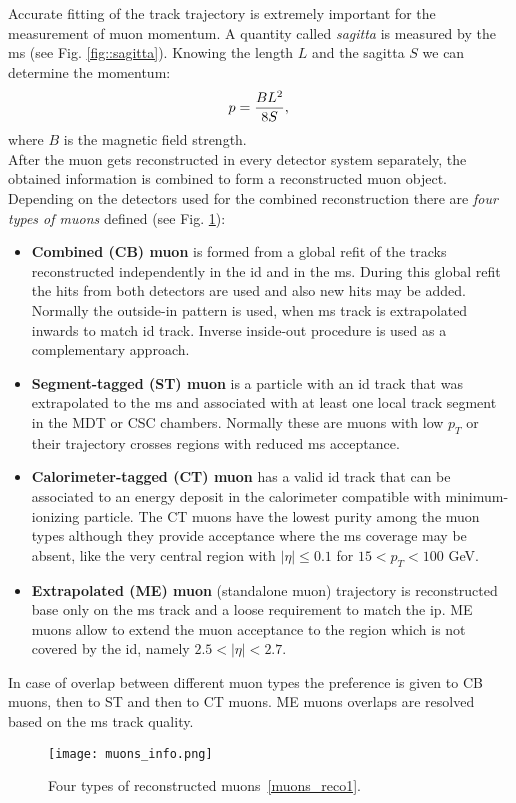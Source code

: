     Accurate fitting of the track trajectory is extremely important for the measurement of muon momentum. A quantity called \textit{sagitta} is measured by the \gls{ms} (see Fig. \ref{fig::sagitta}). Knowing the length $L$ and the sagitta $S$ we can determine the momentum:
    	\begin{equation}
    p = \frac{BL^2}{8S},\\
    \end{equation}
    where $B$ is the magnetic field strength.\\    
    After the muon gets reconstructed in every detector system separately, the obtained information is combined to form a reconstructed muon object. Depending on the detectors used for the combined reconstruction there are \textit{four types of muons} defined (see Fig. \ref{fig::muon_combined}):
    \begin{itemize}
	\item \textbf{Combined (CB) muon} is formed from a global refit of the tracks reconstructed independently in the \gls{id} and in the \gls{ms}. During this global refit the hits from both detectors are used and also new hits may be added. Normally the outside-in pattern is used, when \gls{ms} track is extrapolated inwards to match \gls{id} track. Inverse inside-out procedure is used as a complementary approach.
	\item \textbf{Segment-tagged (ST) muon} is a particle with an \gls{id} track that was extrapolated to the \gls{ms} and associated with at least one local track segment in the MDT or CSC chambers. Normally these are muons with low $p_T$ or their trajectory crosses regions with reduced \gls{ms} acceptance.
	\item \textbf{Calorimeter-tagged (CT) muon} has a valid \gls{id} track that can be associated to an energy deposit in the calorimeter compatible with minimum-ionizing particle. The CT muons have the lowest purity among the muon types although they provide acceptance where the \gls{ms} coverage may be absent, like the very central region with $|\eta| \le 0.1$ for $15<p_T<100$ GeV. 
	\item \textbf{Extrapolated (ME) muon} (standalone muon) trajectory is reconstructed base only on the \gls{ms} track and a loose requirement to match the \gls{ip}. ME muons allow to extend the muon acceptance to the region which is not covered by the \gls{id}, namely $2.5<|\eta| < 2.7$.
	\end{itemize}
	In case of overlap between different muon types the preference is given to CB muons, then to ST and then to CT muons. ME muons overlaps are resolved based on the \gls{ms} track quality.
      \begin{figure}[htbp]
	\centering
	\texttt{[image: muons\_info.png]}
	\caption[Muon reconstruction]{Four types of reconstructed muons~\ref{muons_reco1}.}
	\label{fig::muon_combined}
	\end{figure}
